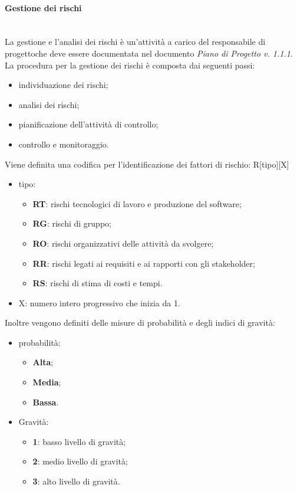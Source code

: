 		\paragraph{Gestione dei rischi}\mbox{}\\ [1mm]
			La gestione e l'analisi dei rischi è un'attività a carico del responsabile di progetto\glosp che deve essere documentata nel documento \textit{Piano di Progetto v. 1.1.1}.
			La procedura per la gestione dei rischi è composta dai seguenti passi:
			\begin{itemize}
				\item individuazione dei rischi;
				\item analisi dei rischi;
				\item pianificazione dell'attività di controllo;
				\item controllo e monitoraggio.
			\end{itemize}
			Viene definita una codifica per l'identificazione dei fattori di rischio: R[tipo][X]
			\begin{itemize}
				\item tipo:
				\begin{itemize}
					\item \textbf{RT}: rischi tecnologici di lavoro e produzione del software;
					\item \textbf{RG}: rischi di gruppo;
					\item \textbf{RO}: rischi organizzativi delle attività da svolgere;
					\item \textbf{RR}: rischi legati ai requisiti e ai rapporti con gli stakeholder\glo;
					\item \textbf{RS}: rischi di stima di costi e tempi.
				\end{itemize}
				\item X: numero intero progressivo che inizia da 1.
			\end{itemize}
			Inoltre vengono definiti delle misure di probabilità e degli indici di gravità:
			\begin{itemize}
				\item probabilità:
				\begin{itemize}
					\item \textbf{Alta};
					\item \textbf{Media};
					\item \textbf{Bassa}.
				\end{itemize}
				\item Gravità:
				\begin{itemize}
					\item \textbf{1}: basso livello di gravità;
					\item \textbf{2}: medio livello di gravità;
					\item \textbf{3}: alto livello di gravità.
				\end{itemize}
			\end{itemize}
